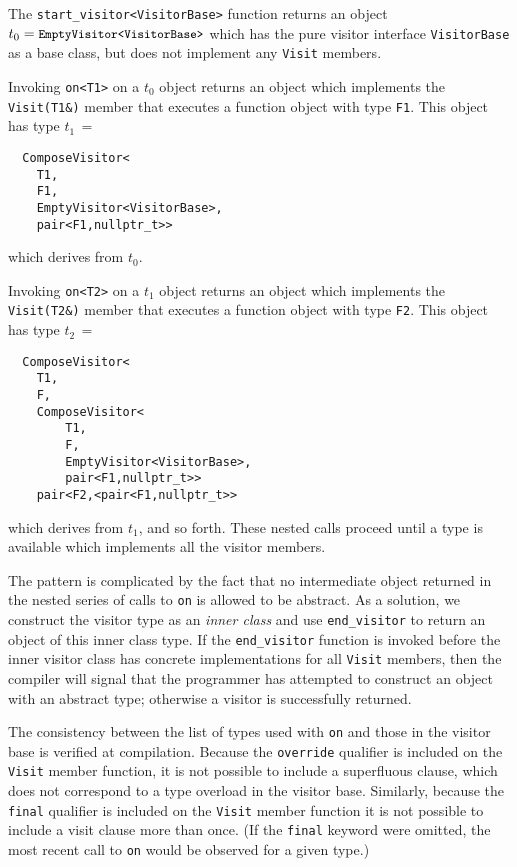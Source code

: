 \documentclass[10pt,a4paper,twocolumn]{article}
\newcommand\mycode[1]{{\small\texttt{#1}}}
\begin{document}
The \mycode{start\_visitor<VisitorBase>} function returns an object $t_0 =
\mbox{\mycode{EmptyVisitor<VisitorBase>}}$ which has the pure visitor interface
\mycode{VisitorBase} as a base class, but does not implement any \mycode{Visit}
members.

Invoking \mycode{on<T1>} on a $t_0$ object returns an object which implements the \mycode{Visit(T1\&)} member that executes a function object with type \mycode{F1}. This object has type $t_1\, =$
{\small\begin{verbatim}
  ComposeVisitor<
    T1,
    F1,
    EmptyVisitor<VisitorBase>,
    pair<F1,nullptr_t>>
\end{verbatim}}
which derives from $t_0$.

Invoking \mycode{on<T2>} on a $t_1$ object returns an object which implements the \mycode{Visit(T2\&)} member that executes a function object with type \mycode{F2}. This object has type $t_2\, =$
{\small\begin{verbatim}
  ComposeVisitor<
    T1,
    F,
    ComposeVisitor<
        T1,
        F,
        EmptyVisitor<VisitorBase>,
        pair<F1,nullptr_t>>
    pair<F2,<pair<F1,nullptr_t>>
\end{verbatim}}
which derives from $t_1$, and so forth. These nested calls proceed until a type is available which implements all the visitor members.

The pattern is complicated by the fact that no intermediate object returned in
the nested series of calls to \mycode{on} is allowed to be abstract. As a
solution, we construct the visitor type as an \emph{inner class} and use
\mycode{end\_visitor} to return an object of this inner class type. If the
\mycode{end\_visitor} function is invoked before the inner visitor class has
concrete implementations for all \mycode{Visit} members, then the compiler will
signal that the programmer has attempted to construct an object with an abstract
type; otherwise a visitor is successfully returned.

The consistency between the list of types used with \mycode{on} and those in the
visitor base is verified at compilation. Because the \mycode{override} qualifier
is included on the \mycode{Visit} member function, it is not possible to include
a superfluous clause, which does not correspond to a type overload in the
visitor base. Similarly, because the \mycode{final} qualifier is included on the
\mycode{Visit} member function it is not possible to include a visit clause more
than once. (If the \mycode{final} keyword were omitted, the most recent call to
\mycode{on} would be observed for a given type.)
\end{document}
